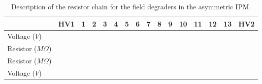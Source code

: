 \begin{table}[ht]
	\centering
	\caption[Description of the resistor chain for the field degraders in the asymmetric IPM]
	{Description of the resistor chain for the field degraders in the asymmetric IPM.}
	\label{}
	\begin{tabular}{llllllllllllllll}
		\toprule
		                       & HV1 & 1 & 2 & 3 & 4 & 5 & 6 & 7 & 8 & 9 & 10 & 11 & 12 & 13 & HV2 \\
		\midrule
		Voltage (\(V\))        &     &   &   &   &   &   &   &   &   &   &    &    &    &    &     \\
		Resistor (\(M\Omega\)) &     &   &   &   &   &   &   &   &   &   &    &    &    &    &     \\
		Resistor (\(M\Omega\)) &     &   &   &   &   &   &   &   &   &   &    &    &    &    &     \\
		Voltage (\(V\))        &     &   &   &   &   &   &   &   &   &   &    &    &    &    &     \\
		\bottomrule
	\end{tabular}
\end{table}